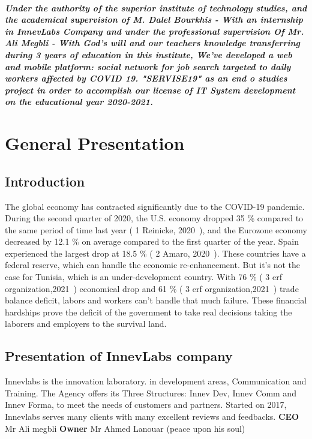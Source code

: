 \documentclass[12pt]{report}
\begin{document}
\paragraph{\normalfont Under the authority of the superior institute of technology studies, and the academical supervision of M. Dalel Bourkhis - With an internship in InnevLabs Company and under the professional supervision
Of Mr. Ali Megbli - With God’s will and our teachers knowledge transferring during 3 years of education in this institute, We’ve developed a web and mobile platform: social network for job search targeted to daily workers affected by COVID 19. "SERVISE19" as an end o studies project in order to accomplish our license of IT System development on the educational year 2020-2021.}

\chapter{General Presentation}
\renewcommand{\thesection}{\arabic{section}}
\setcounter{secnumdepth}{3}


\section*{Introduction}

The global economy has contracted significantly due to the COVID-19 pandemic. During the second quarter of 2020, the U.S. economy dropped 35 \% compared to the same period of time last year ( 1 Reinicke, 2020~\cite{one}), and the Eurozone economy decreased by 12.1 \% on average compared to the first quarter of the year. Spain experienced the largest drop at 18.5 \% ( 2 Amaro, 2020~\cite{two}). These countries have a federal reserve, which can handle the economic re-enhancement. But it's not the case for Tunisia, which is an under-development country. With 76 \% ( 3 erf organization,2021~\cite{three}) economical drop and 61 \% ( 3 erf organization,2021~\cite{three}) trade balance deficit, labors and workers can't handle that much failure.
These financial hardships prove the deficit of the government to take real decisions taking the laborers and employers to the survival land.










\section{Presentation of InnevLabs company}
Innevlabs is the innovation laboratory.
in development areas,
Communication and Training.
The Agency offers its Three Structures:
Innev Dev, Innev Comm and Innev Forma, to meet the needs of customers and partners.
Started on 2017, Innevlabs serves many clients with many excellent reviews and feedbacks.
\textbf{CEO}  Mr Ali megbli \newline
\textbf{Owner} Mr Ahmed Lanouar (peace upon his soul)\newline 
\end{document}
